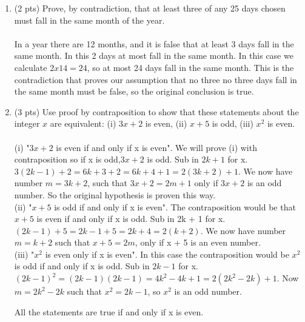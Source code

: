 \documentclass[12pt]{article}
\begin{document}
\begin{enumerate}
\item (2 pts) Prove, by contradiction,  that at least three of any 25 days chosen must fall
in the same month of the year.\\
\\In a year there are 12 months, and it is false that at least 3 days fall in the same month. In this 2 days at most fall in the same month. In this case we calculate $2 x 14 = 24$, so at most 24 days fall in the same month. This is the contradiction that proves our assumption that no three no three days fall in the same month must be false, so the original conclusion is true.


\item (3 pts)
Use proof by contraposition to show that these statements about the integer $x$ are
equivalent: (i) $3x + 2$ is even, (ii) $x + 5$ is odd, (iii) $x^2$
is even.\\
\\(i) "$3x + 2$ is even if and only if x is even". We will prove (i) with contraposition so if x is odd,$3x + 2$ is odd. Sub in $2k + 1$ for x. $3(2k - 1) +2 = 6k + 3 + 2 = 6k + 4 + 1= 2(3k + 2) +1$. We now have number $m = 3k + 2$, such that $3x + 2 = 2m + 1$ only if $3x + 2$ is an odd number. So the original hypothesis is proven this way.\\

(ii) "$x + 5$ is odd if and only if x is even". The contraposition would be that $x + 5$ is even if and only if x is odd. Sub in 2k + 1 for x. $(2k - 1) + 5 = 2k - 1 + 5 = 2k + 4 = 2(k + 2)$. We now have number $m = k + 2$ such that $x + 5 = 2m$, only if x + 5 is an even number.\\

(iii) "$x^2$ is even only if x is even". In this case the contraposition would be $x^2$ is odd if and only if x is odd. Sub in $2k - 1$ for x. $(2k - 1)^2 = (2k - 1)(2k - 1) = 4k^2 -4k + 1 = 2(2k^2 - 2k) + 1$. Now $m = 2k^2 - 2k$ such that $x^2 = 2k - 1$, so $x^2$ is an odd number.

All the statements are true if and only if x is even.



\end{enumerate}
\end{document}
